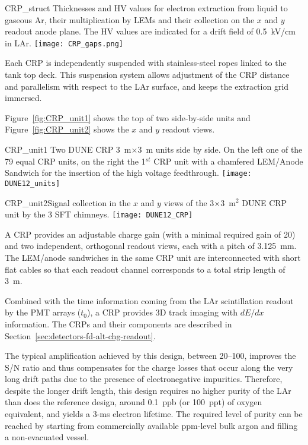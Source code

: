 \begin{cdrfigure}{CRP_struct}
{Thicknesses and HV values for electron extraction from liquid to gaseous Ar, their 
multiplication by LEMs and their collection on the $x$ and $y$ readout anode plane. The 
HV values are indicated for a drift field of 0.5~kV/cm in LAr.}
\texttt{[image: CRP\_gaps.png]}
\end{cdrfigure}

Each CRP  is independently suspended with stainless-steel ropes linked to the tank top deck. This suspension system allows adjustment of the CRP distance and parallelism with respect to the LAr surface, and keeps the extraction grid immersed.

Figure~\ref{fig:CRP_unit1} shows the top of two side-by-side units and Figure~\ref{fig:CRP_unit2} shows the
$x$ and $y$ readout views.

\begin{cdrfigure}{CRP_unit1} {Two DUNE CRP 3~m$\times$3~m units side by side. On the left one of the 79 equal 
CRP units, on the right the 1$^{st}$ CRP unit with a chamfered LEM/Anode Sandwich  for the insertion of the high voltage feedthrough.}
\texttt{[image: DUNE12\_units]}
\end{cdrfigure}
\begin{cdrfigure}
{CRP_unit2}{Signal collection in the $x$ and $y$ views of the  3$\times$3~m$^2$ DUNE CRP unit by the 3 SFT chimneys.}
\texttt{[image: DUNE12\_CRP]}
\end{cdrfigure}

A CRP provides an adjustable charge gain (with a minimal required gain of 20) and two
independent, orthogonal readout views, each with a pitch of 3.125~mm.  The LEM/anode sandwiches 
in the same CRP unit are interconnected with short flat cables so that each readout
channel corresponds to a total strip length of 3~m.

Combined with the time information coming from the LAr scintillation readout by
the PMT arrays ($t_0$), a CRP provides 3D track imaging with $dE/dx$ information. 
The CRPs and their components are described in Section~\ref{sec:detectors-fd-alt-chg-readout}.

The typical amplification achieved by this design, between 20--100, improves the S/N ratio and thus 
compensates for the charge losses that occur along the very long drift paths due to the presence of 
electronegative impurities. Therefore, despite the longer drift length, this design requires no higher 
purity of the LAr than does the reference design, around 0.1~ppb (or 100~ppt) of oxygen equivalent,
and yields a 3-ms electron lifetime. The required level of purity can be reached by starting from 
commercially available ppm-level bulk argon and filling a non-evacuated vessel\cite{WA105_TDR}.

